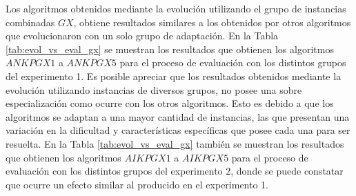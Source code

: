 Los algoritmos obtenidos mediante la evolución utilizando el grupo de instancias combinadas $GX$, obtiene resultados similares a los obtenidos por otros algoritmos que evolucionaron con un solo grupo de adaptación. En la Tabla \ref{tab:evol_vs_eval_gx} se muestran los resultados que obtienen los algoritmos $ANKPGX1$ a $ANKPGX5$ para el proceso de evaluación con los distintos grupos del experimento 1. Es posible apreciar que los resultados obtenidos mediante la evolución utilizando instancias de diversos grupos, no posee una sobre especialización como ocurre con los otros algoritmos. Esto es debido a que los algoritmos se adaptan a una mayor cantidad de instancias, las que presentan una variación en la dificultad y características específicas que posee cada una para ser resuelta. En la Tabla \ref{tab:evol_vs_eval_gx} también se muestran los resultados que obtienen los algoritmos $AIKPGX1$ a $AIKPGX5$ para el proceso de evaluación con los distintos grupos del experimento 2, donde se puede constatar que ocurre un efecto similar al producido en el experimento 1.

